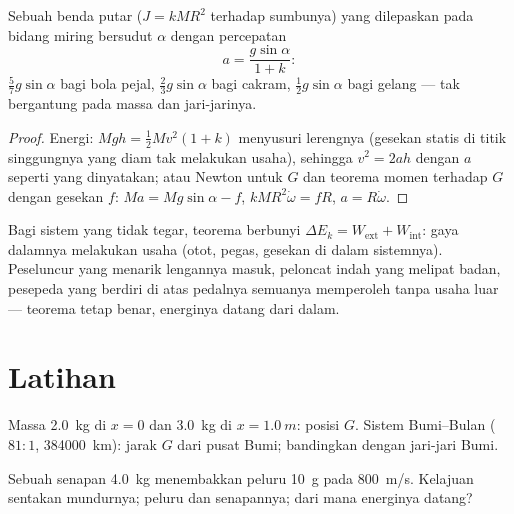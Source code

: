 \begin{proposition}\label{prop:b1:systems-of-points:rollingincline}
Sebuah benda putar ($J = kMR^2$ terhadap sumbunya) yang dilepaskan pada
bidang miring bersudut $\alpha$  dengan percepatan
\[
a = \frac{g\sin\alpha}{1 + k} :
\]
$\tfrac57 g\sin\alpha$ bagi bola pejal, $\tfrac23 g\sin\alpha$ bagi cakram,
$\tfrac12 g\sin\alpha$ bagi gelang --- tak bergantung pada massa dan jari-jarinya.
\end{proposition}

\begin{proof}
Energi: $Mgh = \tfrac12 Mv^2(1 + k)$ menyusuri lerengnya (gesekan statis
di titik singgungnya yang diam tak melakukan usaha), sehingga $v^2 = 2ah$ dengan $a$ seperti
yang dinyatakan; atau Newton untuk $G$ dan teorema momen terhadap $G$ dengan
gesekan $f$: $Ma = Mg\sin\alpha - f$, $kMR^2\dot\omega = fR$, $a = R\dot\omega$.
\end{proof}

\begin{remark}\label{rem:b1:systems-of-points:deformable}
Bagi sistem yang tidak tegar, teorema  berbunyi
$\Delta E_k = W_{\mathrm{ext}} + W_{\mathrm{int}}$: gaya dalamnya melakukan
usaha (otot, pegas, gesekan di dalam sistemnya). Peseluncur yang menarik
lengannya masuk, peloncat indah yang melipat badan, pesepeda yang berdiri di atas pedalnya
semuanya memperoleh  tanpa usaha luar --- teorema  tetap benar, energinya datang dari dalam.
\end{remark}

\section{Latihan}

\begin{exercise}[$\star$]\label{exo:b1:systems-of-points:1}
Massa \qty{2.0}{kg} di $x = 0$ dan \qty{3.0}{kg} di $x = \qty{1.0}{m}$:
posisi $G$. Sistem Bumi--Bulan ($81:1$, \qty{384000}{km}):
jarak $G$ dari pusat Bumi; bandingkan dengan jari-jari
Bumi.
\end{exercise}

\begin{exercise}[$\star$]\label{exo:b1:systems-of-points:2}
Sebuah senapan \qty{4.0}{kg} menembakkan peluru \qty{10}{g} pada \qty{800}{m/s}.
Kelajuan sentakan mundurnya;  peluru dan senapannya; dari mana
energinya datang?
\end{exercise}

